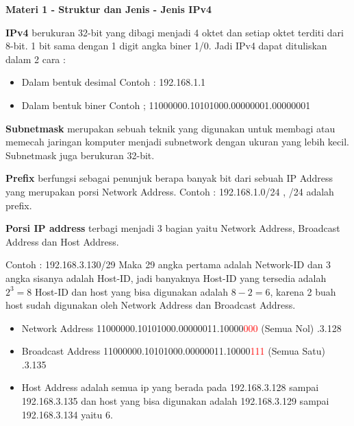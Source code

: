 \documentclass{article}
\begin{document}
    \begin{flushleft}
        \textbf{Materi 1 - Struktur dan Jenis - Jenis IPv4}
        \newline

        \textbf{IPv4} berukuran 32-bit yang dibagi menjadi 4 oktet dan setiap oktet terditi dari 8-bit. 
        1 bit sama dengan 1 digit angka biner 1/0. Jadi IPv4 dapat dituliskan dalam 2 cara :
        \begin{itemize}
            \item[] Dalam bentuk desimal \newline
            Contoh : 192.168.1.1
            \item[] Dalam bentuk biner \newline
            Contoh ; 11000000.10101000.00000001.00000001
        \end{itemize}

        \textbf{Subnetmask} merupakan sebuah teknik yang digunakan untuk membagi atau memecah jaringan komputer menjadi subnetwork dengan ukuran yang lebih kecil. Subnetmask juga berukuran 32-bit. \newline

        \textbf{Prefix} berfungsi sebagai penunjuk berapa banyak bit dari sebuah IP Address yang merupakan porsi Network Address. \newline
        Contoh : 192.168.1.0/24 , /24 adalah prefix. \newline

        \textbf{Porsi IP address} terbagi menjadi 3 bagian yaitu Network Address, Broadcast Address dan Host Address. \newline

        Contoh : 192.168.3.130/29 \newline
        Maka 29 angka pertama adalah Network-ID dan 3 angka sisanya adalah Host-ID, jadi banyaknya Host-ID yang tersedia adalah $2^3 = 8$ Host-ID dan host yang bisa digunakan adalah $8-2 = 6$, karena 2 buah host sudah digunakan oleh Network Address dan Broadcast Address.
        \begin{itemize}
            \item[] Network Address 11000000.10101000.00000011.10000\textcolor{red}{000} (Semua Nol) .3.128
            \item[] Broadcast Address 11000000.10101000.00000011.10000\textcolor{red}{111} (Semua Satu) .3.135
            \item[] Host Address adalah semua ip yang berada pada 192.168.3.128 sampai 192.168.3.135 dan host yang bisa digunakan adalah 192.168.3.129 sampai 192.168.3.134 yaitu 6.
        \end{itemize}
    \end{flushleft}
\end{document}
